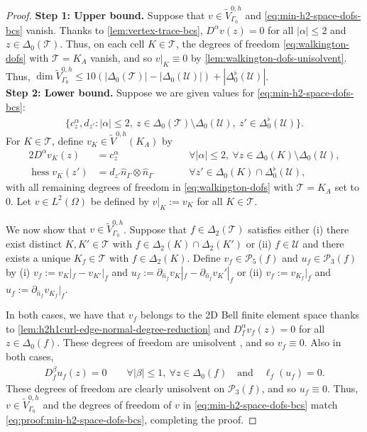 \documentclass{mcom-l}
\theoremstyle{definition}
\theoremstyle{remark}
\numberwithin{equation}{section}
\newcommand{\unitvec}[1]{\hat{#1}}
\DeclareMathOperator{\hess}{hess}
\newcommand{\mesh}[0]{\mathcal{T}}
\newcommand{\boundarymesh}[0]{\mathcal{U}}
\begin{document}
\begin{proof}
	\textbf{Step 1: Upper bound. }
	Suppose that $v \in \tilde{V}^{0, h}_{\Gamma_0}$ and \cref{eq:min-h2-space-dofs-bcs}
	vanish. Thanks to \cref{lem:vertex-trace-bcs}, $D^{\alpha} v(z) = 0$
	for all $|\alpha| \leq 2$ and $z \in \Delta_0(\mesh)$. Thus,
	on each cell $K \in \mesh$, the degrees of freedom 
	\cref{eq:walkington-dofs} with $\mesh = K_A$ vanish, and so $v|_K \equiv 0$
	by \cref{lem:walkington-dofs-unisolvent}. Thus, 
	$\dim \tilde{V}^{0, h}_{\Gamma_0} \leq 
	10(|\Delta_0(\mesh)| - |\Delta_0(\boundarymesh)|)
	+ |\Delta_0^{\flat}(\boundarymesh)|$. \\
	
	\noindent \textbf{Step 2: Lower bound. } Suppose we are given values for 
	\cref{eq:min-h2-space-dofs-bcs}: 
	\begin{align}
		\label{eq:proof:min-h2-space-dofs-bcs}
		\{c_z^{\alpha}, d_{z'} : |\alpha| \leq 2, 
		\ z \in \Delta_0(\mesh) \setminus \Delta_0(\boundarymesh), 
		\ z' \in \Delta_0^{\flat}(\boundarymesh)\}.
	\end{align}
	For $K \in \mesh$, define $v_K \in \tilde{V}^{0, h}(K_A)$ by 
	\begin{alignat*}{2}
		D^{\alpha} v_K(z) &= c_z^{\alpha} \qquad 
		& &\forall |\alpha| \leq 2, \ \forall z \in \Delta_0(K)
		\setminus \Delta_0(\boundarymesh), \\
		\hess v_K(z') &= d_{z'} \unitvec{n}_{\Gamma} \otimes 
		\unitvec{n}_{\Gamma} 
		\qquad 
		& &\forall z' \in \Delta_0(K) \cap \Delta_0^{\flat}(\boundarymesh),
	\end{alignat*}
	with all remaining degrees of freedom in \cref{eq:walkington-dofs} with 
	$\mesh = K_A$ set to 0.
	Let $v \in L^2(\Omega)$ be defined by $v|_K := v_K$ for all 
	$K \in \mesh$. 
	
	We now show that $v \in \tilde{V}^{0, h}_{\Gamma_0}$.
	Suppose that $f \in \Delta_2(\mesh)$ satisfies either (i) there exist 
	distinct
	$K, K' \in \mesh$ with $f \in \Delta_2(K) \cap \Delta_2(K')$
	or (ii) $f \in \boundarymesh$ and there exists a 
	unique $K_f \in \mesh$ with $f \in \Delta_2(K)$. 
	Define $v_f \in \mathcal{P}_5(f)$
	and $u_f \in \mathcal{P}_3(f)$ by 
	(i) $v_f := v_K|_f - v_{K'}|_f$ and 
	$u_f := \partial_{\unitvec{n}_f} v_K|_f - \partial_{\unitvec{n}_f} v_K'|_f$
	or 
	(ii) $v_f := v_{K_f}|_f$ and $u_f := \partial_{\unitvec{n}_f} v_{K_f}|_f$. 
	
	In both cases, we have that $v_f$ belongs to the 
	2D Bell finite element space thanks to 
	\cref{lem:h2h1curl-edge-normal-degree-reduction}
	and $D_f^{\alpha} v_f(z) = 0$ for all $z \in \Delta_0(f)$.
	These degrees of freedom are unisolvent \cite[Theorem 2.2.12]{Ciarlet02},
	and so $v_f \equiv 0$. Also in both cases,
	\begin{align*}
		D_f^{\beta} u_f(z) = 0 \qquad \forall |\beta| \leq 1, 
		\ \forall z \in \Delta_0(f) 
		\quad \text{and} \quad 
		\ell_f(u_f) = 0.
	\end{align*}
	These degrees of freedom are clearly unisolvent on $\mathcal{P}_3(f)$,
	and so $u_f \equiv 0$. Thus, $v \in \tilde{V}^{0, h}_{\Gamma_0}$
	and the degrees of freedom of $v$ in \cref{eq:min-h2-space-dofs-bcs}
	match \cref{eq:proof:min-h2-space-dofs-bcs}, completing the proof.
\end{proof}
\end{document}
